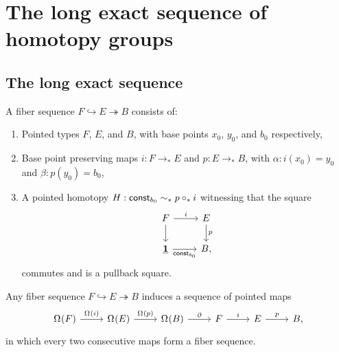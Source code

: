 \section{The long exact sequence of homotopy groups}

\subsection{The long exact sequence}

\begin{defn}
A fiber sequence $F\hookrightarrow E \twoheadrightarrow B$ consists of:
\begin{enumerate}
\item Pointed types $F$, $E$, and $B$, with base points $x_0$, $y_0$, and $b_0$ respectively, 
\item Base point preserving maps $i:F\to_\ast E$ and $p:E\to_\ast B$, with $\alpha:i(x_0)=y_0$ and $\beta:p(y_0)=b_0$,
\item A pointed homotopy $H:\mathsf{const}_{b_0}\sim_\ast p\circ_\ast i$ witnessing that the square
\begin{equation*}
\begin{tikzcd}
F \arrow[r,"i"] \arrow[d] & E \arrow[d,"p"] \\
\unit \arrow[r,swap,"\mathsf{const}_{b_0}"] & B,
\end{tikzcd}
\end{equation*}
commutes and is a pullback square.
\end{enumerate}
\end{defn}

\begin{lem}
Any fiber sequence $F\hookrightarrow E\twoheadrightarrow B$ induces a sequence of pointed maps
\begin{equation*}
\begin{tikzcd}
\loopspace{F} \arrow[r,"\loopspace{i}"] & \loopspace{E} \arrow[r,"\loopspace{p}"] & \loopspace{B} \arrow[r,"\partial"] & F \arrow[r,"i"] & E \arrow[r,"p"] & B,
\end{tikzcd}
\end{equation*}
in which every two consecutive maps form a fiber sequence.
\end{lem}

